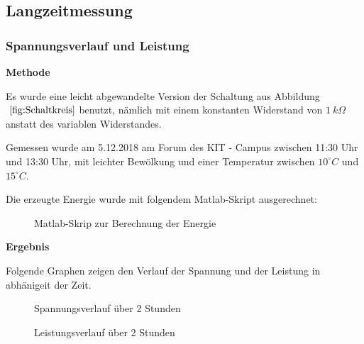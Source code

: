 \subsection {Langzeitmessung}                                       %
    \subsubsection{Spannungsverlauf und Leistung}                       %
        \textbf{Methode}
        \newline
        \par Es wurde eine leicht abgewandelte Version der Schaltung aus Abbildung $~\ref{fig:Schaltkreis}$ benutzt, nämlich mit einem konstanten Widerstand von $1\ k\Omega$ anstatt des variablen Widerstandes.
        \par Gemessen wurde am 5.12.2018 am Forum des KIT - Campus zwischen 11:30 Uhr und 13:30 Uhr, mit leichter Bewölkung und einer Temperatur zwischen $10^{\circ}C$ und $15^{\circ}C$.
        \par Die erzeugte Energie wurde mit folgendem Matlab-Skript ausgerechnet:
        
        \begin{figure}[H]
            
            \caption{Matlab-Skrip zur Berechnung der Energie}
        \end{figure}
        
        \vspace{4mm}
        \noindent
        \textbf{Ergebnis}
        \newline
        \par Folgende Graphen zeigen den Verlauf der Spannung und der Leistung in abhänigeit der Zeit.
        
        \begin{figure}[H]
            \def\svgwidth{\textwidth}
            
            
            \caption{Spannungsverlauf über 2 Stunden}
        \end{figure}

        \begin{figure}[H]
            \def\svgwidth{\textwidth}
            
            
            \caption{Leistungsverlauf über 2 Stunden}
        \end{figure}
        
